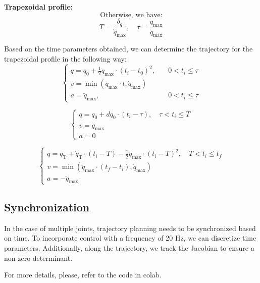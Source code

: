 \documentclass{article}
\begin{document}
\textbf{Trapezoidal profile:}
\[
\text{Otherwise, we have:}
\]
\[
T = \frac{\delta_q}{\dot{q}_{\text{max}}}, \quad \tau = \frac{\dot{q}_{\text{max}}}{\ddot{q}_{\text{max}}}
\]


Based on the time parameters obtained, we can determine the trajectory for the trapezoidal profile in the following way:
\[
\begin{cases}
q = q_0 + \frac{1}{2} \ddot{q}_{\text{max}} \cdot (t_i - t_0)^2, & \quad 0 < t_i \leq \tau \\
v = \min(\ddot{q}_{\text{max}} \cdot t, \dot{q}_{\text{max}}) \\
a = \ddot{q}_{\text{max}}, & \quad 0 < t_i \leq \tau
\end{cases}
\]


\[
\begin{cases}
q = q_0 + dq_0 \cdot (t_i - \tau), \quad \tau < t_i \leq T\\
v = \dot{q}_{\text{max}}\\
a = 0
\end{cases}
\]

\[
\begin{cases}
q = q_{\text{T}} + \dot{q}_{\text{T}} \cdot (t_i - T) - \frac{1}{2} \ddot{q}_{\text{max}} \cdot (t_i - T)^2, \quad T < t_i \leq t_f\\
v = \min(\ddot{q}_{\text{max}} \cdot (t_f - t_i), \dot{q}_{\text{max}})\\
a = -\ddot{q}_{\text{max}}
\end{cases}
\]

\subsection{Synchronization}
In the case of multiple joints, trajectory planning needs to be synchronized based on time.
To incorporate control with a frequency of 20 Hz, we can discretize time parameters.
Additionally, along the trajectory, we track the Jacobian to ensure a non-zero determinant.

For more details, please, refer to the code in colab.
\end{document}
